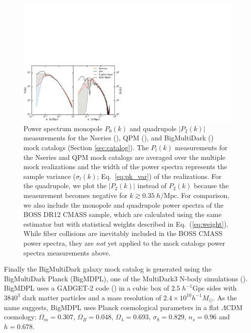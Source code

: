 \begin{figure}
\begin{center}
\includegraphics[scale=0.55]{figs/fc/mock_catalog_Plk.pdf} 
\caption{
Power spectrum monopole $P_0(k)$ and 
quadrupole $|P_2(k)|$ measurements for the Nseries (\nseriescolor), 
QPM (\qpmcolor), and BigMultiDark (\bmdcolor) mock catalogs 
(Section \ref{sec:catalog}). The $P_l(k)$ measurements 
for the Nseries and QPM mock catalogs are averaged over the
multiple mock realizations and the width of the power spectra represents 
the sample variance ($\sigma_l(k)$; Eq.~\ref{eq:pk_var}) of the realizations. 
For the quadrupole, we plot the $|{P_2(k)}|$ instead of 
${P_2(k)}$ because the measurement becomes negative for 
$k \gtrsim 0.35\;h/\mathrm{Mpc}$. For comparison, we also include the monopole and 
quadrupole power spectra of the BOSS DR12 CMASS sample, which are calculated 
using the same estimator but with statistical weights described in Eq.~(\ref{eq:weight}). 
While fiber collisions are inevitably included in the BOSS CMASS power spectra, 
they are {\it not} yet applied to the mock catalogs power spectra measurements above. } 
\label{fig:mockpk}
\end{center}
\end{figure}

Finally the BigMultiDark galaxy mock catalog is generated using the 
BigMultiDark Planck (BigMDPL), one of the MultiDark3 N-body simulations 
(\citealt{Klypin:2014aa}). BigMDPL uses a GADGET-2 code (\citealt{Springel:2005aa})
in a cubic box of $2.5\;h^{-1}\mathrm{Gpc}$ sides with $3840^3$ dark matter 
particles and a mass resolution of $2.4\times 10^{10} h^{-1}M_\odot$. 
As the name suggests, BigMDPL uses Planck cosmological parameters in a flat $\Lambda$CDM cosmology: 
$\Omega_m = 0.307$, $\Omega_B = 0.048$, $\Omega_\lambda = 0.693$, $\sigma_8 = 0.829$, 
$n_s = 0.96$ and $h = 0.678$. 


